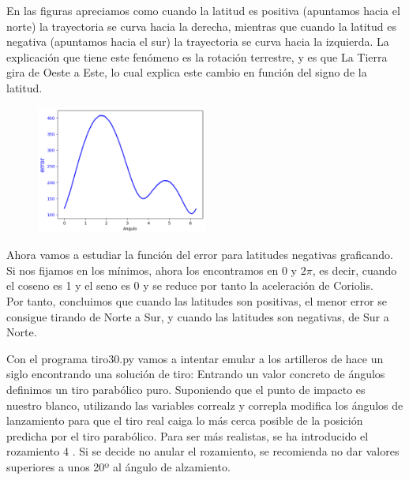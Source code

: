 \documentclass[11pt]{article}
\newcommand{\laputa}[1]{\begin{note}{#1}{}\end{note}}
\begin{document}
            \vspace{-0.2cm}
            \noindent En las figuras apreciamos como cuando la latitud es positiva (apuntamos hacia el norte) la trayectoria se curva hacia la derecha, mientras que cuando la latitud es negativa (apuntamos hacia el sur) la trayectoria se curva hacia la izquierda. La explicación que tiene este fenómeno es la rotación terrestre, y es que La Tierra gira de Oeste a Este, lo cual explica este cambio en función del signo de la latitud.\\
            \vspace{-0.2cm}
            \begin{figure}
                \vspace{-0.6cm}
                \centering
                \includegraphics[width=0.5\textwidth]{fotos/gráficas/error-40.png}
            \end{figure}
            \noindent Ahora vamos a estudiar la función del error para latitudes negativas graficando. Si nos fijamos en los mínimos, ahora los encontramos en $0$ y $2\pi$, es decir, cuando el coseno es 1 y el seno es 0 y se reduce por tanto la aceleración de Coriolis.\\
            
            \vspace{-0.1cm}\noindent Por tanto, concluimos que cuando las latitudes son positivas, el menor error se consigue tirando de Norte a Sur, y cuando las latitudes son negativas, de Sur a Norte.
        
        \clearpage
        \laputa{Con el programa tiro30.py vamos a intentar emular a los artilleros de hace un siglo encontrando una solución de tiro: Entrando un valor concreto de ángulos definimos un tiro parabólico puro. Suponiendo que el punto de impacto es nuestro blanco, utilizando las variables correalz y correpla modifica los ángulos de lanzamiento para que el tiro real caiga lo más cerca posible de la posición predicha por el tiro parabólico. Para ser más realistas, se ha introducido el rozamiento 4 . Si se decide no anular el rozamiento, se recomienda no dar valores superiores a unos 20º al ángulo de alzamiento.}
\end{document}
